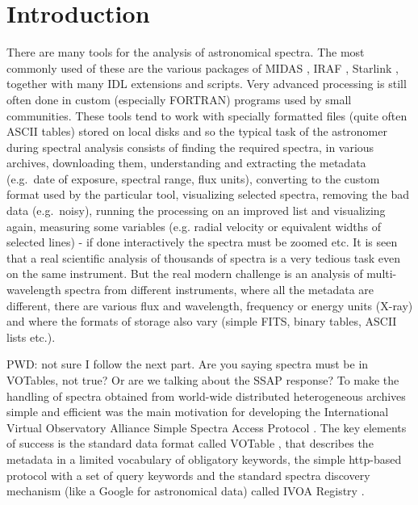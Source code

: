 \documentclass[final,authoryear,5p,times,twocolumn]{elsarticle}
\begin{document}
\newcommand{\qjras}{QJRAS}

\newcommand{\ascl}[1]{\href{http://www.ascl.net/#1}{ascl:#1}}

\section{Introduction}

There are many tools for the analysis of astronomical spectra.
The most commonly used of these are the various packages of
MIDAS \citep[][\ascl{1302.017}]{1992ASPC...25..115W}, IRAF
\citep[][\ascl{9911.002}]{2012ASPC..461..595F}, Starlink
\citep[][\ascl{1110.012}]{1982QJRAS..23..485D}, together
with many IDL extensions and scripts. Very advanced processing
is still often done in custom (especially FORTRAN) programs
used by small communities.  These tools tend to work with
specially formatted files (quite often ASCII tables) stored on
local disks and so the typical task of the astronomer during spectral
analysis consists of finding the required spectra, in various archives,
downloading them, understanding and extracting the metadata (e.g.\ date of
exposure, spectral range, flux units), converting to the custom format used
by the particular tool, visualizing selected spectra, removing the bad
data (e.g.\ noisy), running the processing on an improved list and visualizing
again, measuring some variables (e.g. radial velocity or equivalent
widths of selected lines) - if done interactively the spectra must be
zoomed etc.  It is seen that a real scientific analysis of thousands
of spectra is a very tedious task even on the same instrument. But the
real modern challenge is an analysis of multi-wavelength spectra from
different instruments, where all the metadata are different, there are
various flux and wavelength, frequency or energy units (X-ray) and
where the formats of storage also vary (simple FITS, binary tables, ASCII
lists etc.).

{\color{red} PWD: not sure I follow the next part. Are you saying spectra
must be in VOTables, not true? Or are we talking about the SSAP response?
}
To make the handling of spectra obtained from world-wide distributed
heterogeneous archives simple and efficient was the main motivation for
developing the International Virtual Observatory Alliance Simple
Spectra Access Protocol \citep[IVOA SSAP;][]{ssap}. The key elements
of success is the standard data format called VOTable
\citep{2004tivo.conf..118O}, that describes the metadata in a limited
vocabulary of obligatory keywords, the simple http-based protocol with
a set of query keywords and the standard spectra discovery mechanism
(like a Google for astronomical data) called IVOA Registry \citep{registry}.
\end{document}
